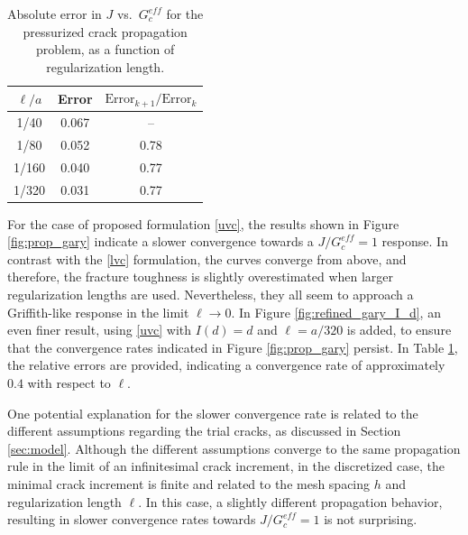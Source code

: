 \begin{table}[h]
\centering
\begin{tabular}{ccc}
\hline
$\ell/a$ &Error &$\text{Error}_{k+1}/\text{Error}_{k}$ \\
\hline
1/40  & 0.067 & --\\
1/80  & 0.052 & 0.78\\
1/160 & 0.040 & 0.77\\
1/320 & 0.031 & 0.77\\
\hline
\end{tabular}
\caption{Absolute error in $J$ vs.\ $G_c^{eff}$ for the pressurized crack propagation problem, as a function of regularization length.}
\label{table:convergence_check}
\end{table}

For the case of proposed formulation \eqref{uvc}, the results shown in Figure \ref{fig:prop_gary} indicate a slower convergence towards a 
$J/G^{eff}_c = 1$ response. In contrast with the \eqref{lvc} formulation, the curves converge from above, and therefore, the fracture toughness is slightly overestimated when larger regularization lengths are used. Nevertheless, they all seem to approach a Griffith-like response in the limit $\ell \rightarrow 0$. In Figure \ref{fig:refined_gary_I_d}, an even finer result, using \eqref{uvc} with $I(d)=d$ and $\ell = a/320$ is added, to ensure that the convergence rates indicated in Figure \ref{fig:prop_gary} persist. In Table \ref{table:convergence_check}, the relative errors are provided, indicating a convergence rate of approximately $0.4$ with respect to $\ell$.

One potential explanation for the slower convergence rate is related to the different assumptions regarding the trial cracks, as discussed in Section \ref{sec:model}. Although the different assumptions converge to the same propagation rule in the limit of an infinitesimal crack increment, in the discretized case, the minimal crack increment is finite and related to the mesh spacing $h$ and regularization length $\ell$. In this case, a slightly different propagation behavior, resulting in slower convergence rates towards $J/G^{eff}_c = 1$ is not surprising. 
